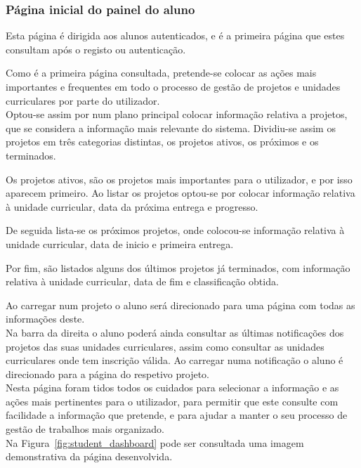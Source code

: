 \subsubsection{Página inicial do painel do aluno}

Esta página é dirigida aos alunos autenticados, e é a primeira página que estes consultam após o registo ou autenticação.

Como é a primeira página consultada, pretende-se colocar as ações mais importantes e frequentes em todo o processo de gestão de projetos e unidades curriculares por parte do utilizador.\\

Optou-se assim por num plano principal colocar informação relativa a projetos, que se considera a informação mais relevante do sistema. Dividiu-se assim os projetos em três categorias distintas, os projetos ativos, os próximos e os terminados.

Os projetos ativos, são os projetos mais importantes para o utilizador, e por isso aparecem primeiro. Ao listar os projetos optou-se por colocar informação relativa à unidade curricular, data da próxima entrega e progresso.

De seguida lista-se os próximos projetos, onde colocou-se informação relativa à unidade curricular, data de inicio e primeira entrega.

Por fim, são listados alguns dos últimos projetos já terminados, com informação relativa à unidade curricular, data de fim e classificação obtida.

Ao carregar num projeto o aluno será direcionado para uma página com todas as informações deste.\\

Na barra da direita o aluno poderá ainda consultar as últimas notificações dos projetos das suas unidades curriculares, assim como consultar as unidades curriculares onde tem inscrição válida.
Ao carregar numa notificação o aluno é direcionado para a página do respetivo projeto.\\

Nesta página foram tidos todos os cuidados para selecionar a informação e as ações mais pertinentes para o utilizador, para permitir que este consulte com facilidade a informação que pretende, e para ajudar a manter o seu processo de gestão de trabalhos mais organizado.\\

Na Figura~\ref{fig:student_dashboard} pode ser consultada uma imagem demonstrativa da página desenvolvida.

